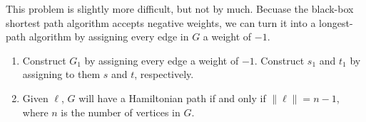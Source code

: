 \documentclass{math}
\begin{document}
This problem is slightly more difficult, but not by much.  Becuase the black-box
shortest path algorithm accepts negative weights, we can turn it into a
longest-path algorithm by assigning every edge in \( G \) a weight of \( -1 \).
\begin{enumerate}
        \renewcommand{\theenumi}{\alph{enumi}}
    \item Construct \( G_1 \) by assigning every edge a weight of \( -1 \).
        Construct $s_1$ and $t_1$ by assigning to them $s$ and $t$,
        respectively.
    \item Given \( \ell \), \( G \) will have a Hamiltonian path if and only if
        \( \|\ell\| = n - 1 \), where \( n \) is the number of vertices in \( G
        \).
\end{enumerate}
\end{document}
